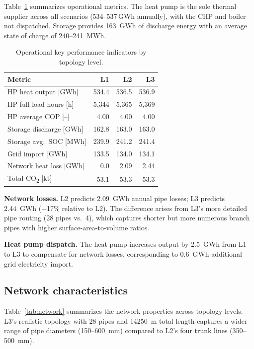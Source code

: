 \documentclass[a4paper,fleqn]{cas-dc}
\begin{document}
Table~\ref{tab:kpis} summarizes operational metrics. The heat pump is the sole thermal supplier across all scenarios (534--537\,GWh annually), with the CHP and boiler not dispatched. Storage provides \SI{163}{GWh} of discharge energy with an average state of charge of 240--\SI{241}{MWh}.

\begin{table}[t]
\centering
\caption{Operational key performance indicators by topology level.}\label{tab:kpis}
\begin{tabular*}{\tblwidth}{@{}lrrr@{}}
\toprule
Metric & \textbf{L1} & \textbf{L2} & \textbf{L3} \\
\midrule
HP heat output [GWh] & 534.4 & 536.5 & 536.9 \\
HP full-load hours [h] & 5,344 & 5,365 & 5,369 \\
HP average COP [--] & 4.00 & 4.00 & 4.00 \\
Storage discharge [GWh] & 162.8 & 163.0 & 163.0 \\
Storage avg.\ SOC [MWh] & 239.9 & 241.2 & 241.4 \\
Grid import [GWh] & 133.5 & 134.0 & 134.1 \\
Network heat loss [GWh] & 0.0 & 2.09 & 2.44 \\
Total CO\textsubscript{2} [kt] & 53.1 & 53.3 & 53.3 \\
\bottomrule
\end{tabular*}
\end{table}

\textbf{Network losses.} L2 predicts \SI{2.09}{GWh} annual pipe losses; L3 predicts \SI{2.44}{GWh} (+17\% relative to L2). The difference arises from L3's more detailed pipe routing (28 pipes vs.\ 4), which captures shorter but more numerous branch pipes with higher surface-area-to-volume ratios.

\textbf{Heat pump dispatch.} The heat pump increases output by \SI{2.5}{GWh} from L1 to L3 to compensate for network losses, corresponding to \SI{0.6}{GWh} additional grid electricity import.

\subsection{Network characteristics}

Table~\ref{tab:network} summarizes the network properties across topology levels. L3's realistic topology with 28 pipes and \SI{14250}{m} total length captures a wider range of pipe diameters (150--\SI{600}{mm}) compared to L2's four trunk lines (350--\SI{500}{mm}).
\end{document}
